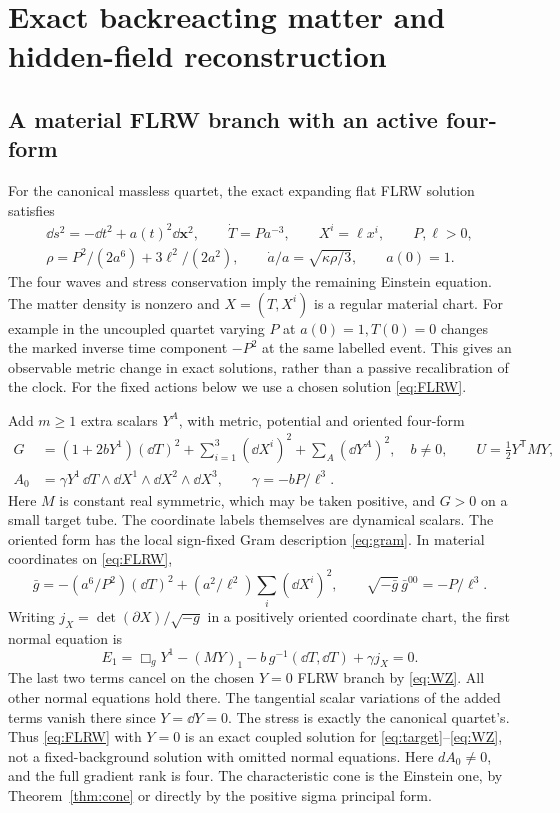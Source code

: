 \section{Exact backreacting matter and hidden-field reconstruction}\label{sec:examples}

\subsection{A material FLRW branch with an active four-form}
For the canonical massless quartet, the exact expanding flat FLRW solution satisfies
\begin{equation}\label{eq:FLRW}
 \begin{gathered}
 \dd s^2=-\dd t^2+a(t)^2\dd\mathbf x^2,\qquad
 \dot T=P a^{-3},\qquad X^i=\ell x^i,\qquad P,\ell>0,\\
 \rho=P^2/(2a^6)+3\ell^2/(2a^2),\qquad
 \dot a/a=\sqrt{\kappa\rho/3},\qquad a(0)=1.
 \end{gathered}
\end{equation}
The four waves and stress conservation imply the remaining Einstein equation. The matter density is nonzero and \(X=(T,X^i)\) is a regular material chart. For example in the uncoupled quartet varying \(P\) at \(a(0)=1,T(0)=0\) changes the marked inverse time component \(-P^2\) at the same labelled event. This gives an observable metric change in exact solutions, rather than a passive recalibration of the clock. For the fixed actions below we use a chosen solution \eqref{eq:FLRW}.

Add \(m\ge1\) extra scalars \(Y^A\), with metric, potential and oriented four-form
\begin{align}
 G&=(1+2bY^1)(\dd T)^2+\sum_{i=1}^3(\dd X^i)^2
                         +\sum_A(\dd Y^A)^2,\quad b\ne0,\qquad
 U=\tfrac12 Y^{\mathsf T}M Y, \label{eq:target}\\
 A_0&=\gamma Y^1\,\dd T\wedge\dd X^1\wedge\dd X^2\wedge\dd X^3,\qquad
 \gamma=-bP/\ell^3 . \label{eq:WZ}
\end{align}
Here \(M\) is constant real symmetric, which may be taken positive, and \(G>0\) on a small target tube. The coordinate labels themselves are dynamical scalars. The oriented form has the local sign-fixed Gram description \eqref{eq:gram}. In material coordinates on \eqref{eq:FLRW},
\[
 \bar g=-(a^6/P^2)(\dd T)^2+(a^2/\ell^2)\sum_i(\dd X^i)^2,\qquad
 \sqrt{-\bar g}\,\bar g^{00}=-P/\ell^3 .
\]
Writing \(j_X=\det(\partial X)/\sqrt{-g}\) in a positively oriented coordinate chart, the first normal equation is
\[
 E_1=\Box_gY^1-(MY)_1-b\,g^{-1}(\dd T,\dd T)+\gamma j_X=0 .
\]
The last two terms cancel on the chosen \(Y=0\) FLRW branch by \eqref{eq:WZ}. All other normal equations hold there. The tangential scalar variations of the added terms vanish there since \(Y=\dd Y=0\). The stress is exactly the canonical quartet's. Thus \eqref{eq:FLRW} with \(Y=0\) is an exact coupled solution for \eqref{eq:target}--\eqref{eq:WZ}, not a fixed-background solution with omitted normal equations. Here \(dA_0\ne0\), and the full gradient rank is four. The characteristic cone is the Einstein one, by Theorem~\ref{thm:cone} or directly by the positive sigma principal form.

